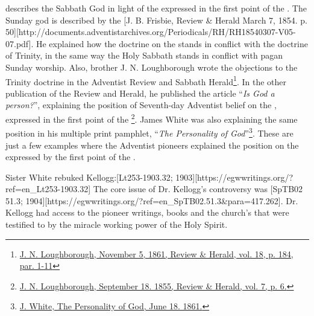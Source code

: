 describes the Sabbath God in light of the  expressed in the first point of the . The Sunday god is described by the [J. B. Frisbie, Review \& Herald March 7, 1854. p. 50][http://documents.adventistarchives.org/Periodicals/RH/RH18540307-V05-07.pdf]. He explained how the doctrine on the  stands in conflict with the doctrine of Trinity, in the same way the Holy Sabbath stands in conflict with pagan Sunday worship. Also, brother J. N. Loughborough wrote the objections to the Trinity doctrine in the Adventist Review and Sabbath Herald\footnote{\href{https://adventistdigitallibrary.org/adl-349160/advent-review-and-sabbath-herald-november-5-1861}{J. N. Loughborough, November 5, 1861, Review \& Herald, vol. 18, p. 184, par. 1-11}}. In the other publication of the Review and Herald, he published the article “\textit{Is God a person?}”, explaining the position of Seventh-day Adventist belief on the , expressed in the first point of the \footnote{\href{http://documents.adventistarchives.org/Periodicals/RH/RH18550918-V07-06.pdf}{J. N. Loughborough, September 18. 1855, Review \& Herald, vol. 7, p. 6.}}. James White was also explaining the same position in his multiple print pamphlet, “\textit{The Personality of God}”\footnote{\href{https://egwwritings.org/?ref=en_PERGO.1.1&para=1471.3}{J. White, The Personality of God, June 18. 1861.}}. These are just a few examples where the Adventist pioneers explained the position on the  expressed by the first point of the .

Sister White rebuked Kellogg:[Lt253-1903.32; 1903][https://egwwritings.org/?ref=en\_Lt253-1903.32] The core issue of Dr. Kellogg’s controversy was [SpTB02 51.3; 1904][https://egwwritings.org/?ref=en\_SpTB02.51.3&para=417.262]. Dr. Kellogg had access to the pioneer writings, books and the church's  that were testified to by the miracle working power of the Holy Spirit. 

